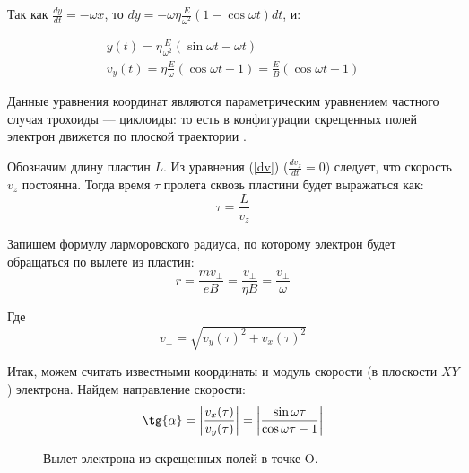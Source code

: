 Так как $\frac{dy}{dt}=-\omega{x}$, то $dy=-\omega\eta\frac{E}{\omega^2}(1-\cos{\omega{t}}){dt}$, и:

\begin{gather}
	\label{eq:y_t}
	y(t)=\eta\frac{E}{\omega^2}(\sin{\omega{t}}-\omega{t})\\
	v_y(t)=\eta\frac{E}{\omega}(\cos\omega{t}-1)=\frac{E}{B}(\cos\omega{t}-1)
\end{gather}

Данные уравнения координат являются параметрическим уравнением частного случая трохоиды --- циклоиды: то есть в конфигурации скрещенных полей электрон движется по плоской траектории \cite{bellustin,arcimovich,andreev}.

Обозначим длину пластин $L$. Из уравнения (\ref{dv}) ($\frac{dv_z}{dt}=0$) следует, что скорость $v_z$ постоянна. Тогда время $\tau$ пролета сквозь пластини будет выражаться как:
\begin{equation}
	\tau=\frac{L}{v_z}
\end{equation}

Запишем формулу ларморовского радиуса, по которому электрон будет обращаться по вылете из пластин:
\begin{equation}
	r=\frac{mv_\perp}{eB}=\frac{v_\perp}{\eta{B}}=\frac{v_\perp}{\omega}
\end{equation}

Где 
\begin{equation}
	v_\perp=\sqrt{v_y(\tau)^2+v_x(\tau)^2}
\end{equation}

Итак, можем считать известными координаты и модуль скорости (в плоскости $XY$) электрона. 
Найдем направление скорости:
\begin{equation}
	\label{eq:tg_a}
	\tg{\alpha}=\left|\frac{v_x(\tau)}{v_y(\tau)}\right|=\left|\frac{\sin{\omega{\tau}}}{\cos\omega{\tau}-1}\right|
\end{equation}



\begin{figure}[ht!]
\vspace{1cm}
\centering
\begin{minipage}[ht!]{0.49\linewidth}
\end{minipage}
\hfill
\begin{minipage}[ht!]{0.49\linewidth}
\end{minipage}
\vspace{0.5cm}
\caption{Вылет электрона из скрещенных полей в точке O.}
\vspace{1cm}
\label{ris:vert_hor}
\end{figure}

